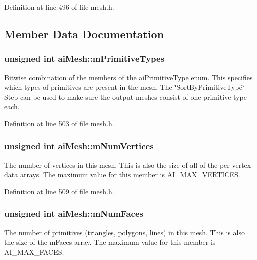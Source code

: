 Definition at line 496 of file mesh.h.

\subsection{Member Data Documentation}
\hypertarget{structai_mesh_99d66ac0a444068c1b252b30265cbf53}{
\subsubsection[mPrimitiveTypes]{\setlength{\rightskip}{0pt plus 5cm}unsigned int {\bf aiMesh::mPrimitiveTypes}}}
\label{structai_mesh_99d66ac0a444068c1b252b30265cbf53}


Bitwise combination of the members of the aiPrimitiveType enum. This specifies which types of primitives are present in the mesh. The \char`\"{}SortByPrimitiveType\char`\"{}-Step can be used to make sure the output meshes consist of one primitive type each. 

Definition at line 503 of file mesh.h.\hypertarget{structai_mesh_b34b7b5941e6636f1c08f615cbb072ef}{
\subsubsection[mNumVertices]{\setlength{\rightskip}{0pt plus 5cm}unsigned int {\bf aiMesh::mNumVertices}}}
\label{structai_mesh_b34b7b5941e6636f1c08f615cbb072ef}


The number of vertices in this mesh. This is also the size of all of the per-vertex data arrays. The maximum value for this member is AI\_\-MAX\_\-VERTICES. 

Definition at line 509 of file mesh.h.\hypertarget{structai_mesh_eed22ee6963b79548f3877b3c905518e}{
\subsubsection[mNumFaces]{\setlength{\rightskip}{0pt plus 5cm}unsigned int {\bf aiMesh::mNumFaces}}}
\label{structai_mesh_eed22ee6963b79548f3877b3c905518e}


The number of primitives (triangles, polygons, lines) in this mesh. This is also the size of the mFaces array. The maximum value for this member is AI\_\-MAX\_\-FACES. 

